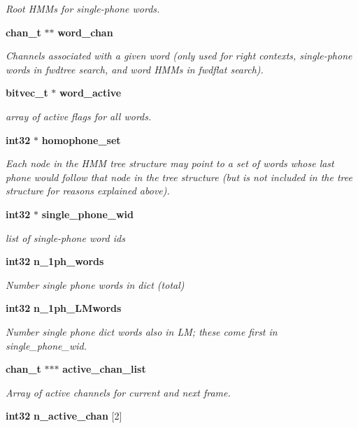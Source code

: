 \begin{DoxyCompactItemize}
\begin{DoxyCompactList}\small\item\em \-Root \-H\-M\-Ms for single-\/phone words. \end{DoxyCompactList}\item 
{\bf chan\-\_\-t} $\ast$$\ast$ {\bf word\-\_\-chan}
\begin{DoxyCompactList}\small\item\em \-Channels associated with a given word (only used for right contexts, single-\/phone words in fwdtree search, and word \-H\-M\-Ms in fwdflat search). \end{DoxyCompactList}\item 
{\bf bitvec\-\_\-t} $\ast$ {\bf word\-\_\-active}
\begin{DoxyCompactList}\small\item\em array of active flags for all words. \end{DoxyCompactList}\item 
{\bf int32} $\ast$ {\bf homophone\-\_\-set}
\begin{DoxyCompactList}\small\item\em \-Each node in the \-H\-M\-M tree structure may point to a set of words whose last phone would follow that node in the tree structure (but is not included in the tree structure for reasons explained above). \end{DoxyCompactList}\item 
{\bf int32} $\ast$ {\bf single\-\_\-phone\-\_\-wid}\label{structngram__search__s_a1157923e0060b947e05caa819c8abe2c}

\begin{DoxyCompactList}\small\item\em list of single-\/phone word ids \end{DoxyCompactList}\item 
{\bf int32} {\bf n\-\_\-1ph\-\_\-words}\label{structngram__search__s_a9168184c862d6f63bd7926e6581b25d9}

\begin{DoxyCompactList}\small\item\em \-Number single phone words in dict (total) \end{DoxyCompactList}\item 
{\bf int32} {\bf n\-\_\-1ph\-\_\-\-L\-Mwords}\label{structngram__search__s_a988672d895f1ee61dbf790b2065df4df}

\begin{DoxyCompactList}\small\item\em \-Number single phone dict words also in \-L\-M; these come first in single\-\_\-phone\-\_\-wid. \end{DoxyCompactList}\item 
{\bf chan\-\_\-t} $\ast$$\ast$$\ast$ {\bf active\-\_\-chan\-\_\-list}
\begin{DoxyCompactList}\small\item\em \-Array of active channels for current and next frame. \end{DoxyCompactList}\item 
{\bf int32} {\bf n\-\_\-active\-\_\-chan} [2]\label{structngram__search__s_ac33f60894871671ec5c2173ca56d600f}


\end{DoxyCompactItemize}
